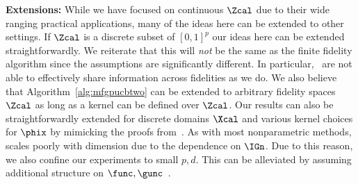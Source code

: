 \textbf{Extensions:}
While we have focused on continuous $\Zcal$ due to their wide ranging
practical applications, many of the ideas here can be extended to other settings.
If $\Zcal$ is a discrete subset of $[0,1]^p$ our ideas here can be extended
straightforwardly.
We reiterate that this will \emph{not} be the same as the finite fidelity
\mfgpucbones algorithm  since the assumptions are significantly different.
In particular,~\citet{kandasamy16mfbo} are not able to effectively share
information across fidelities as we do.
We also believe that Algorithm~\ref{alg:mfgpucbtwo} can be extended to arbitrary fidelity
spaces $\Zcal$ as long as a kernel can be defined over $\Zcal$.
Our results can also be straightforwardly extended for discrete domains $\Xcal$
and various kernel choices for $\phix$ by mimicking the proofs
from~\citet{srinivas10gpbandits}.
As with most nonparametric methods, \mfgpucbtwos scales poorly with
dimension due to the dependence on $\IGn$.
Due to this reason, we also confine our experiments to small $p,d$.
This can be alleviated by assuming additional structure on
$\func,\gunc$~\citep{djolonga13highdimbandits,kandasamy15addBO}.


